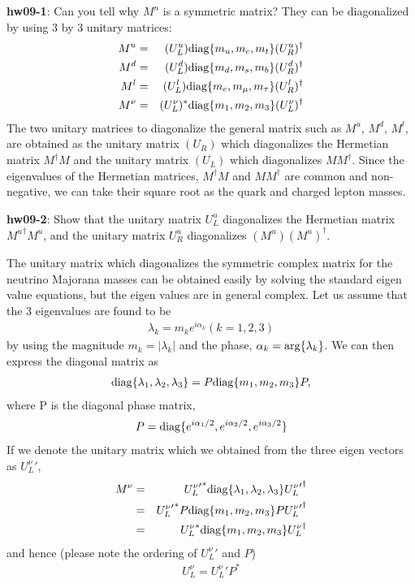 \documentclass[12pt]{article}
\begin{document}
{\bf hw09-1}: Can you tell why $M^n$ is a symmetric matrix?
  They can be diagonalized by using 3 by 3 unitary matrices:
\begin{eqnarray}
  M^u &=& (U^u_L)   {\rm diag}\{m_u, m_c,m_t\} (U^u_R)^\dagger \\
  M^d &=& (U^d_L)   {\rm diag}\{m_d, m_s,  m_b  \} (U^d_R)^\dagger \\
  M^l &=& (U^l_L)   {\rm diag}\{m_e, m_\mu, m_\tau\} (U^l_R)^\dagger \\
  M^\nu &=& (U^\nu_L)^* {\rm diag}\{m_1, m_2,  m_3  \} (U^\nu_L)^\dagger
\end{eqnarray}
  The two unitary matrices to diagonalize the general matrix such as
  $M^u$, $M^d$, $M^l$, are obtained as the unitary matrix $(U_R)$ which
  diagonalizes the Hermetian matrix $M^\dagger M$ and the unitary matrix
  $(U_L)$ which diagonalizes $M M^\dagger$.  Since the eigenvalues of the
  Hermetian matrices, $M^\dagger M$ and $M M^\dagger$ are common and
  non-negative, we can take their square root as the quark and charged
  lepton masses.

{\bf hw09-2}: Show that the unitary matrix $U^u_L$ diagonalizes the 
Hermetian matrix ${M^u}^\dagger M^u$, and the unitary matrix $U^u_R$ 
diagonalizes $(M^u) (M^u)^\dagger$.

  The unitary matrix which diagonalizes the symmetric complex matrix 
for the neutrino Majorana masses can be obtained easily by solving the
  standard eigen value equations, but the eigen values are in general
  complex.  Let us assume that the 3 eigenvalues are found to be
\begin{eqnarray}
  \lambda_k = m_k e^{i \alpha_k}   (k=1,2,3)
\end{eqnarray}
  by using the magnitude $m_k = | \lambda_k |$ and the phase, $\alpha_k
  = {\rm arg}\{ \lambda_k \}$. We can then express the diagonal matrix as
 \begin{eqnarray}
  {\rm diag}\{ \lambda_1, \lambda_2, \lambda_3 \}
  = P {\rm diag}\{ m_1,        m_2,        m_3        \} P,
 \end{eqnarray}
  where P is the diagonal phase matrix,
\begin{eqnarray}
  P =  {\rm diag}\{ e^{i\alpha_1/2}, e^{i\alpha_2/2}, e^{i\alpha_3/2}\}
\end{eqnarray}
  If we denote the unitary matrix which we obtained from the three
  eigen vectors as ${U^\nu_L}'$,
\begin{eqnarray}
  M^\nu &=& {{U^\nu_L}'}^*  {\rm diag}\{\lambda_1, \lambda_2, \lambda_3\}  {{U^\nu_L}'}^\dagger \\
  &=& {{U^\nu_L}'}^* P {\rm diag}\{m_1, m_2, m_3\} P {{U^\nu_L}'}^\dagger \\
  &=& {U^\nu_L}^*     {\rm diag}\{m_1, m_2, m_3\}  {U^\nu_L}^\dagger
\end{eqnarray}
  and hence (please note the ordering of ${U^\nu_L}'$ and $P$)
  \begin{eqnarray}
    U^\nu_L = {U^\nu_L}' P^* \label{eq.9unm}
  \end{eqnarray}
\end{document}
